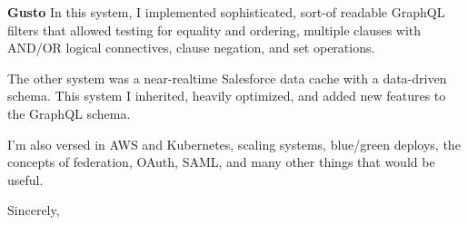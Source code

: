 \documentclass[11pt]{letter} %
\begin{document}
\begin{letter}{\large \bfseries Gusto}
In this system, I implemented sophisticated, sort-of readable GraphQL filters that allowed
testing for equality and ordering, multiple clauses with AND/OR logical connectives,
clause negation, and set operations.

The other system was a near-realtime Salesforce data cache with a data-driven schema.  This
system I inherited, heavily optimized, and added new features to the GraphQL schema.

I'm also versed in AWS and Kubernetes, scaling systems, blue/green deploys, the concepts of
federation, OAuth, SAML, and many other things that would be useful.

\closing{Sincerely,}


\end{letter}
\end{document}
